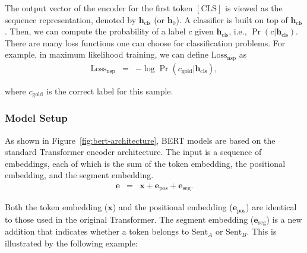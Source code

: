 \noindent The output vector of the encoder for the first token $\mathrm{[CLS]}$ is viewed as the sequence representation, denoted by $\mathbf{h}_{\mathrm{cls}}$ (or $\mathbf{h}_0$). A classifier is built on top of $\mathbf{h}_{\mathrm{cls}}$. Then, we can compute the probability of a label $c$ given $\mathbf{h}_{\mathrm{cls}}$, i.e., $\Pr(c|\mathbf{h}_{\mathrm{cls}})$. There are many loss functions one can choose for classification problems. For example, in maximum likelihood training, we can define $\mathrm{Loss}_{\mathrm{nsp}}$ as
\begin{eqnarray}
\mathrm{Loss}_{\mathrm{nsp}} & = & -\log \Pr(c_{\mathrm{gold}}|\mathbf{h}_{\mathrm{cls}}),
\end{eqnarray}

\noindent where $c_{\mathrm{gold}}$ is the correct label for this sample.

\subsubsection{Model Setup}

\noindent As shown in Figure~\ref{fig:bert-architecture}, BERT models are based on the standard Transformer encoder architecture. The input is a sequence of embeddings, each of which is the sum of the token embedding, the positional embedding, and the segment embedding.
\begin{eqnarray}
\mathbf{e} & = & \mathbf{x} + \mathbf{e}_{\mathrm{pos}} + \mathbf{e}_{\mathrm{seg}}.
\end{eqnarray}

\noindent Both the token embedding ($\mathbf{x}$) and the positional embedding ($\mathbf{e}_{\mathrm{pos}}$) are identical to those used in the original Transformer. The segment embedding ($\mathbf{e}_{\mathrm{seg}}$) is a new addition that indicates whether a token belongs to $\mathrm{Sent}_{A}$ or $\mathrm{Sent}_{B}$. This is illustrated by the following example:

